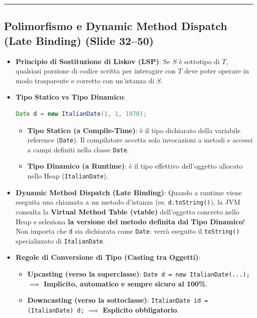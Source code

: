 \documentclass[11pt,a4paper,oneside]{report}
\newcommand{\passthrough}[1]{#1}
\providecommand{\tightlist}{\setlength{\itemsep}{0pt}\setlength{\parskip}{0pt}}
\begin{document}
\begin{center}\rule{0.5\linewidth}{0.5pt}\end{center}

\subsection{Polimorfismo e Dynamic Method Dispatch (Late Binding) (Slide
32--50)}\label{chap11_polimorfismo-e-dynamic-method-dispatch-late-binding-slide-3250}

\begin{itemize}
\item
  \textbf{Principio di Sostituzione di Liskov (LSP)}: Se \(S\) è
  sottotipo di \(T\), qualsiasi porzione di codice scritta per
  interagire con \(T\) deve poter operare in modo trasparente e corretto
  con un'istanza di \(S\).
\item
  \textbf{Tipo Statico vs Tipo Dinamico}:

\begin{lstlisting}[language=Java]
Date d = new ItalianDate(1, 1, 1970);
\end{lstlisting}

  \begin{itemize}
  \tightlist
  \item
    \textbf{Tipo Statico (a Compile-Time)}: è il tipo dichiarato della
    variabile reference (\passthrough{\lstinline!Date!}). Il compilatore
    accetta solo invocazioni a metodi e accessi a campi definiti nella
    classe \passthrough{\lstinline!Date!}.
  \item
    \textbf{Tipo Dinamico (a Runtime)}: è il tipo effettivo dell'oggetto
    allocato nello Heap (\passthrough{\lstinline!ItalianDate!}).
  \end{itemize}
\item
  \textbf{Dynamic Method Dispatch (Late Binding)}: Quando a runtime
  viene eseguita una chiamata a un metodo d'istanza (es.
  \passthrough{\lstinline!d.toString()!}), la JVM consulta la
  \textbf{Virtual Method Table (vtable)} dell'oggetto concreto nello
  Heap e seleziona \textbf{la versione del metodo definita dal Tipo
  Dinamico}! Non importa che \passthrough{\lstinline!d!} sia dichiarata
  come \passthrough{\lstinline!Date!}: verrà eseguito il
  \passthrough{\lstinline!toString()!} specializzato di
  \passthrough{\lstinline!ItalianDate!}.
\item
  \textbf{Regole di Conversione di Tipo (Casting tra Oggetti)}:

  \begin{itemize}
  \item
    \textbf{Upcasting (verso la superclasse)}:
    \passthrough{\lstinline!Date d = new ItalianDate(...);!}
    \(\implies\) \textbf{Implicito, automatico e sempre sicuro al
    100\%}.
  \item
    \textbf{Downcasting (verso la sottoclasse)}:
    \passthrough{\lstinline!ItalianDate id = (ItalianDate) d;!}
    \(\implies\) \textbf{Esplicito obbligatorio}.


\end{itemize}
\end{itemize}
\end{document}
